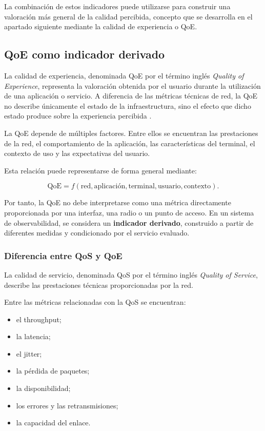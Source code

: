La combinación de estos indicadores puede utilizarse para construir una
valoración más general de la calidad percibida, concepto que se desarrolla
en el apartado siguiente mediante la calidad de experiencia o QoE.

\subsection{QoE como indicador derivado}
\label{subsec:qoe-indicador-derivado}

La calidad de experiencia, denominada QoE por el término inglés
\textit{Quality of Experience}, representa la valoración obtenida por el
usuario durante la utilización de una aplicación o servicio. A
diferencia de las métricas técnicas de red, la QoE no describe
únicamente el estado de la infraestructura, sino el efecto que dicho
estado produce sobre la experiencia percibida \cite{itu_qoe}.

La QoE depende de múltiples factores. Entre ellos se encuentran las
prestaciones de la red, el comportamiento de la aplicación, las
características del terminal, el contexto de uso y las expectativas del
usuario.

Esta relación puede representarse de forma general mediante:

\[
    \mathrm{QoE}
    =
    f
    \left(
        \text{red},
        \text{aplicación},
        \text{terminal},
        \text{usuario},
        \text{contexto}
    \right).
\]

Por tanto, la QoE no debe interpretarse como una métrica directamente
proporcionada por una interfaz, una radio o un punto de acceso. En un
sistema de observabilidad, se considera un
\textbf{indicador derivado}, construido a partir de diferentes medidas y
condicionado por el servicio evaluado.


\subsubsection*{Diferencia entre QoS y QoE}

La calidad de servicio, denominada QoS por el término inglés
\textit{Quality of Service}, describe las prestaciones técnicas
proporcionadas por la red.

Entre las métricas relacionadas con la QoS se encuentran:

\begin{itemize}
    \item el throughput;

    \item la latencia;

    \item el jitter;

    \item la pérdida de paquetes;

    \item la disponibilidad;

    \item los errores y las retransmisiones;

    \item la capacidad del enlace.
\end{itemize}

